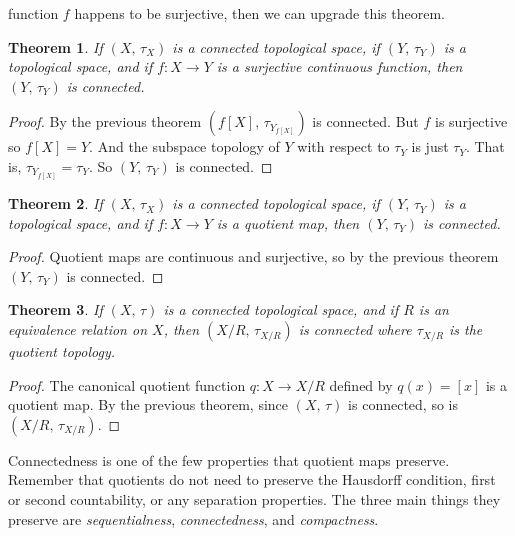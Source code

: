 \documentclass{article}
\theoremstyle{plain}
\newtheorem{theorem}{Theorem}[section]
\theoremstyle{normal}
\begin{document}
        function $f$ happens to be surjective, then we can upgrade this theorem.
        \begin{theorem}
            If $(X,\,\tau_{X})$ is a connected topological space, if
            $(Y,\,\tau_{Y})$ is a topological space, and if $f:X\rightarrow{Y}$
            is a surjective continuous function, then $(Y,\,\tau_{Y})$ is
            connected.
        \end{theorem}
        \begin{proof}
            By the previous theorem $(f[X],\,\tau_{Y_{f[X]}})$ is connected.
            But $f$ is surjective so $f[X]=Y$. And the subspace topology of
            $Y$ with respect to $\tau_{Y}$ is just $\tau_{Y}$. That is,
            $\tau_{Y_{f[X]}}=\tau_{Y}$. So $(Y,\,\tau_{Y})$ is connected.
        \end{proof}
        \begin{theorem}
            If $(X,\,\tau_{X})$ is a connected topological space, if
            $(Y,\,\tau_{Y})$ is a topological space, and if $f:X\rightarrow{Y}$
            is a quotient map, then $(Y,\,\tau_{Y})$ is connected.
        \end{theorem}
        \begin{proof}
            Quotient maps are continuous and surjective, so by the previous
            theorem $(Y,\,\tau_{Y})$ is connected.
        \end{proof}
        \begin{theorem}
            If $(X,\,\tau)$ is a connected topological space, and if $R$ is an
            equivalence relation on $X$, then $(X/R,\,\tau_{X/R})$ is
            connected where $\tau_{X/R}$ is the quotient topology.
        \end{theorem}
        \begin{proof}
            The canonical quotient function $q:X\rightarrow{X}/R$ defined by
            $q(x)=[x]$ is a quotient map. By the previous theorem, since
            $(X,\,\tau)$ is connected, so is $(X/R,\,\tau_{X/R})$.
        \end{proof}
        Connectedness is one of the few properties that quotient maps preserve.
        Remember that quotients do not need to preserve the Hausdorff condition,
        first or second countability, or any separation properties. The three
        main things they preserve are \textit{sequentialness},
        \textit{connectedness}, and \textit{compactness}.
        \par\hfill\par
\end{document}
